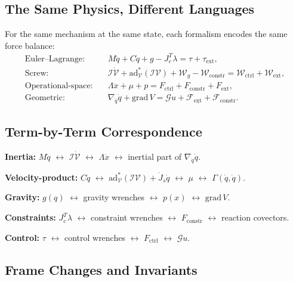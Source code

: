 \documentclass[11pt]{article}
\begin{document}
\subsection{The Same Physics, Different Languages}

For the same mechanism at the same state, each formalism encodes the same force balance:
\begin{align}
\text{Euler--Lagrange:}\quad & M\ddot{q}+C\dot{q}+g-J_c^T\lambda = \tau+\tau_{\mathrm{ext}}, \label{eq:xf-gen}\\
\text{Screw:}\quad & \mathcal{I}\dot{\mathcal{V}}+\mathrm{ad}_{\mathcal{V}}^*(\mathcal{I}\mathcal{V})+\mathcal{W}_g-\mathcal{W}_{\mathrm{constr}} = \mathcal{W}_{\mathrm{ctrl}}+\mathcal{W}_{\mathrm{ext}}, \label{eq:xf-screw}\\
\text{Operational-space:}\quad & \Lambda\ddot{x}+\mu+p = F_{\mathrm{ctrl}}+F_{\mathrm{constr}}+F_{\mathrm{ext}}, \label{eq:xf-os}\\
\text{Geometric:}\quad & \nabla_{\dot{q}}\dot{q}+\mathrm{grad}\,V = \mathcal{G}u+\mathcal{F}_{\mathrm{ext}}+\mathcal{F}_{\mathrm{constr}}. \label{eq:xf-geo}
\end{align}

\subsection{Term-by-Term Correspondence}

\textbf{Inertia:} $M\ddot{q}$ $\leftrightarrow$ $\mathcal{I}\dot{\mathcal{V}}$ $\leftrightarrow$ $\Lambda\ddot{x}$ $\leftrightarrow$ inertial part of $\nabla_{\dot{q}}\dot{q}$.

\textbf{Velocity-product:} $C\dot{q}$ $\leftrightarrow$ $\mathrm{ad}_{\mathcal{V}}^*(\mathcal{I}\mathcal{V})+\dot{J}_s\dot{q}$ $\leftrightarrow$ $\mu$ $\leftrightarrow$ $\Gamma(\dot{q},\dot{q})$.

\textbf{Gravity:} $g(q)$ $\leftrightarrow$ gravity wrenches $\leftrightarrow$ $p(x)$ $\leftrightarrow$ $\mathrm{grad}\,V$.

\textbf{Constraints:} $J_c^T\lambda$ $\leftrightarrow$ constraint wrenches $\leftrightarrow$ $F_{\mathrm{constr}}$ $\leftrightarrow$ reaction covectors.

\textbf{Control:} $\tau$ $\leftrightarrow$ control wrenches $\leftrightarrow$ $F_{\mathrm{ctrl}}$ $\leftrightarrow$ $\mathcal{G}u$.

\subsection{Frame Changes and Invariants}
\end{document}
